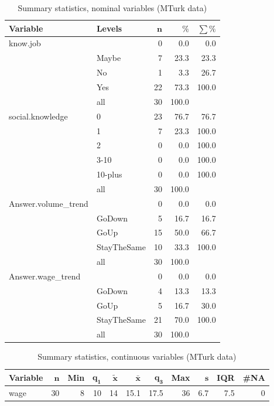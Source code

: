 \documentclass[a4paper,10pt]{article}\usepackage[]{graphicx}\usepackage[]{color}
\begin{document}
\begin{table}[ht]
\centering
{\footnotesize
\begin{tabular}{ll|rrr}
 \textbf{Variable} & \textbf{Levels} & $\mathbf{n}$ & $\mathbf{\%}$ & $\mathbf{\sum \%}$ \\ 
  \hline
know.job &  & 0 & 0.0 & 0.0 \\ 
   & Maybe & 7 & 23.3 & 23.3 \\ 
   & No & 1 & 3.3 & 26.7 \\ 
   & Yes & 22 & 73.3 & 100.0 \\ 
   \hline
 & all & 30 & 100.0 &  \\ 
   \hline
\hline
social.knowledge & 0 & 23 & 76.7 & 76.7 \\ 
   & 1 & 7 & 23.3 & 100.0 \\ 
   & 2 & 0 & 0.0 & 100.0 \\ 
   & 3-10 & 0 & 0.0 & 100.0 \\ 
   & 10-plus & 0 & 0.0 & 100.0 \\ 
   \hline
 & all & 30 & 100.0 &  \\ 
   \hline
\hline
Answer.volume\_trend &  & 0 & 0.0 & 0.0 \\ 
   & GoDown & 5 & 16.7 & 16.7 \\ 
   & GoUp & 15 & 50.0 & 66.7 \\ 
   & StayTheSame & 10 & 33.3 & 100.0 \\ 
   \hline
 & all & 30 & 100.0 &  \\ 
   \hline
\hline
Answer.wage\_trend &  & 0 & 0.0 & 0.0 \\ 
   & GoDown & 4 & 13.3 & 13.3 \\ 
   & GoUp & 5 & 16.7 & 30.0 \\ 
   & StayTheSame & 21 & 70.0 & 100.0 \\ 
   \hline
 & all & 30 & 100.0 &  \\ 
   \hline
\hline
\end{tabular}
}
\caption{Summary statistics, nominal variables (MTurk data)} 
\label{tab1:43-3010}
\end{table}
\begin{table}[ht]
\centering
{\footnotesize
\begin{tabular}{lrrrrrrrrrr}
 \textbf{Variable} & $\mathbf{n}$ & \textbf{Min} & $\mathbf{q_1}$ & $\mathbf{\widetilde{x}}$ & $\mathbf{\bar{x}}$ & $\mathbf{q_3}$ & \textbf{Max} & $\mathbf{s}$ & \textbf{IQR} & \textbf{\#NA} \\ 
  \hline
wage & 30 & 8 & 10 & 14 & 15.1 & 17.5 & 36 & 6.7 & 7.5 & 0 \\ 
  \end{tabular}
}
\caption{Summary statistics, continuous variables (MTurk data)} 
\label{tab2:43-3010}
\end{table}
\end{document}

